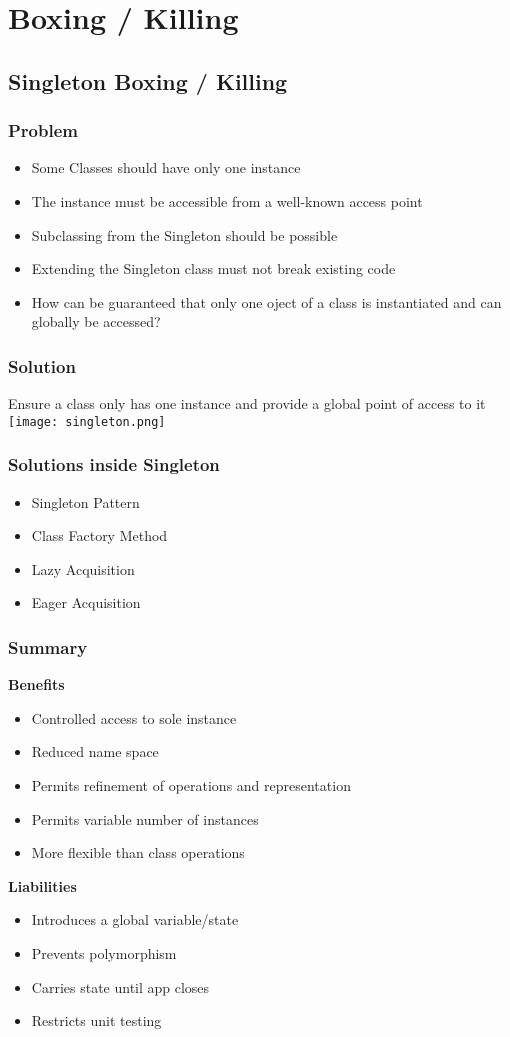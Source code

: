 \section{Boxing / Killing}
\subsection{Singleton Boxing / Killing}
\subsubsection{Problem}
\begin{itemize}
    \item Some Classes should have only one instance
    \item The instance must be accessible from a well-known access point
    \item Subclassing from the Singleton should be possible
    \item Extending the Singleton class must not break existing code
    \item How can be guaranteed that only one oject of a class is instantiated and can globally be accessed?
\end{itemize}
\subsubsection{Solution}
Ensure a class only has one instance and provide a global point of access to it
\texttt{[image: singleton.png]}
\subsubsection{Solutions inside Singleton}
\begin{itemize}
    \item Singleton Pattern
    \item Class Factory Method
    \item Lazy Acquisition
    \item Eager Acquisition
\end{itemize}
\subsubsection{Summary}
\textbf{Benefits}
\begin{itemize}
    \item Controlled access to sole instance
    \item Reduced name space
    \item Permits refinement of operations and representation
    \item Permits variable number of instances
    \item More flexible than class operations
\end{itemize}
\textbf{Liabilities}
\begin{itemize}
    \item Introduces a global variable/state
    \item Prevents polymorphism
    \item Carries state until app closes
    \item Restricts unit testing
\end{itemize}

